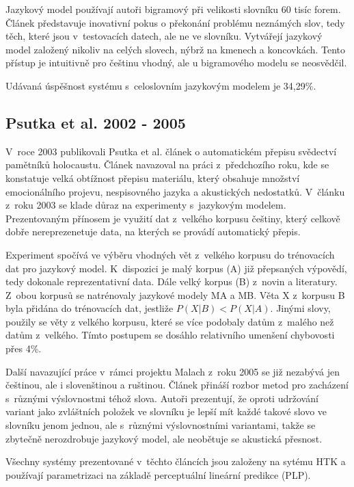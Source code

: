 Jazykový model používají autoři bigramový při velikosti slovníku 60 tisíc forem.
Článek představuje inovativní pokus o překonání problému neznámých slov, tedy
těch, které jsou v~testovacích datech, ale ne ve slovníku. Vytvářejí jazykový
model založený nikoliv na celých slovech, nýbrž na kmenech a koncovkách. Tento
přístup je intuitivně pro češtinu vhodný, ale u bigramového modelu se
neosvědčil.

Udávaná úspěšnost systému s~celoslovním jazykovým modelem je 34,29\%.

\subsection{Psutka et al. 2002 - 2005}

V~roce 2003 publikovali Psutka et al. článek o automatickém přepisu svědectví
pamětníků holocaustu\cite{psutka2003large}. Článek navazoval na práci
z~předchozího roku\cite{psutka2002automatic}, kde se konstatuje velká obtížnost
přepisu materiálu, který obsahuje množství emocionálního projevu, nespisovného
jazyka a akustických nedostatků. V~článku z~roku 2003 se klade důraz na
experimenty s~jazykovým modelem. Prezentovaným přínosem je využití dat z~velkého
korpusu češtiny, který celkově dobře nereprezenetuje data, na kterých se provádí
automatický přepis.

Experiment spočívá ve výběru vhodných vět z~velkého korpusu do trénovacích dat
pro jazykový model. K~dispozici je malý korpus (A) již přepsaných výpovědí, tedy
dokonale reprezentativní data. Dále velký korpus (B) z~novin a literatury.
Z~obou korpusů se natrénovaly jazykové modely MA a MB. Věta X z~korpusu B byla
přidána do trénovacích dat, jestliže $P(X|B) < P(X|A)$. Jinými slovy, použily se
věty z velkého korpusu, které se více podobaly datům z~malého než datům
z~velkého. Tímto postupem se dosáhlo relativního umenšení chybovosti přes 4\%.

Další navazující práce v~rámci projektu Malach\cite{psutka2005automatic} z~roku
2005 se již nezabývá jen češtinou, ale i slovenštinou a ruštinou. Článek
přináší rozbor metod pro zacházení s~různými výslovnostmi téhož slova. Autoři
prezentují, že oproti udržování variant jako zvláštních položek ve slovníku je
lepší mít každé takové slovo ve slovníku jenom jednou, ale s~různými
výslovnostními variantami, takže se zbytečně nerozdrobuje jazykový model, ale
neobětuje se akustická přesnost.

Všechny systémy prezentované v~těchto článcích jsou založeny na sytému HTK a
používají parametrizaci na základě perceptuální lineární predikce (PLP).

